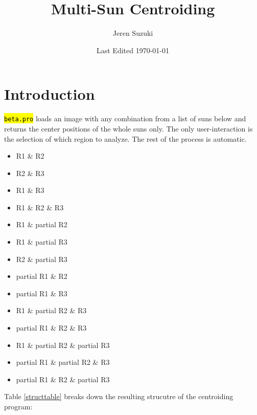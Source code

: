 \documentclass[10pt]{scrartcl}
\title{Multi-Sun Centroiding}
\author{Jeren Suzuki}
\date{Last Edited \today}
\begin{document}
\maketitle
{}
\tableofcontents
\clearpage
{}

\section{Introduction} %
\label{sec:introduction}
\hl{\texttt{beta.pro}} loads an image with any combination from a list of suns below and returns the center positions of the whole suns only. The only user-interaction is the selection of which region to analyze. The rest of the process is automatic. 

\begin{itemize}
    \item R1 \& R2
    \item R2 \& R3
    \item R1 \& R3
    \item R1 \& R2 \& R3
    \item R1 \& partial R2
    \item R1 \& partial R3
    \item R2 \& partial R3
    \item partial R1 \& R2
    \item partial R1 \& R3
    \item R1 \& partial R2 \& R3
    \item partial R1 \& R2 \& R3
    \item R1 \& partial R2 \& partial R3
    \item partial R1 \& partial R2 \& R3
    \item partial R1 \& R2 \& partial R3
\end{itemize}

Table \ref{structtable} breaks down the resulting strucutre of the centroiding program:\\
\end{document}
